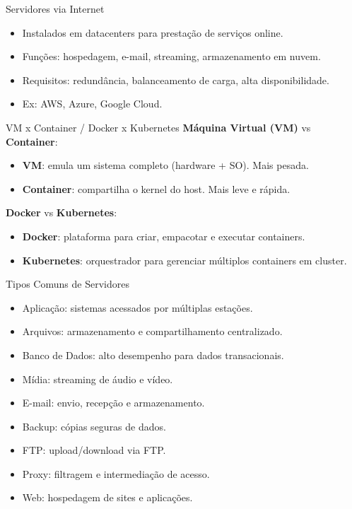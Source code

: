 \documentclass{beamer}
\begin{document}
\begin{frame}{Servidores via Internet}
\begin{itemize}
    \item Instalados em datacenters para prestação de serviços online.
    \item Funções: hospedagem, e-mail, streaming, armazenamento em nuvem.
    \item Requisitos: redundância, balanceamento de carga, alta disponibilidade.
    \item Ex: AWS, Azure, Google Cloud.
\end{itemize}
\end{frame}

\begin{frame}{VM x Container / Docker x Kubernetes}
\textbf{Máquina Virtual (VM)} vs \textbf{Container}:
\begin{itemize}
    \item \textbf{VM}: emula um sistema completo (hardware + SO). Mais pesada.
    \item \textbf{Container}: compartilha o kernel do host. Mais leve e rápida.
\end{itemize}

\vspace{0.5cm}
\textbf{Docker} vs \textbf{Kubernetes}:
\begin{itemize}
    \item \textbf{Docker}: plataforma para criar, empacotar e executar containers.
    \item \textbf{Kubernetes}: orquestrador para gerenciar múltiplos containers em cluster.
\end{itemize}
\end{frame}

\begin{frame}{Tipos Comuns de Servidores}
\begin{itemize}
    \item Aplicação: sistemas acessados por múltiplas estações.
    \item Arquivos: armazenamento e compartilhamento centralizado.
    \item Banco de Dados: alto desempenho para dados transacionais.
    \item Mídia: streaming de áudio e vídeo.
    \item E-mail: envio, recepção e armazenamento.
    \item Backup: cópias seguras de dados.
    \item FTP: upload/download via FTP.
    \item Proxy: filtragem e intermediação de acesso.
    \item Web: hospedagem de sites e aplicações.
\end{itemize}
\end{frame}
\end{document}
